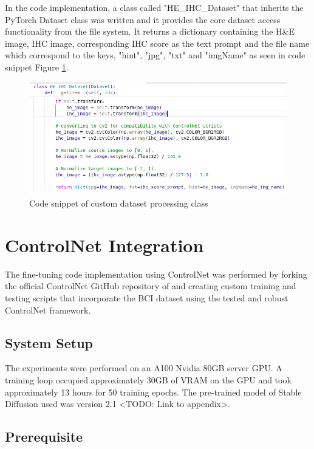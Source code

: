 In the code implementation, a class called "HE\_IHC\_Dataset" that inherits the PyTorch Dataset class was written and it provides the core dataset access functionality from the file system. It returns a dictionary containing the H\&E image, IHC image, corresponding IHC score as the text prompt and the file name which correspond to the keys, "hint", "jpg", "txt" and "imgName" as seen in code snippet Figure \ref{fig:he-ihc-dataset-class}.  
\begin{figure}[ht]
    \centering
    \includegraphics[width=1\linewidth]{4_ResearchMethodology/figures/he_ihc_dataset_class_return_snippet.png}
    \caption[Custom dataset processing class]{Code snippet of custom dataset processing class}
    \label{fig:he-ihc-dataset-class}
\end{figure}

\section{ControlNet Integration}

The fine-tuning code implementation using ControlNet was performed by forking the official ControlNet GitHub repository of \parencite{Zhang2023AddingModels} and creating custom training and testing scripts that incorporate the BCI dataset using the tested and robust ControlNet framework.

\subsection{System Setup}

The experiments were performed on an A100 Nvidia 80GB server GPU. A training loop occupied approximately 30GB of VRAM on the GPU and took approximately 13 hours for 50 training epochs. The pre-trained model of Stable Diffusion used was version 2.1 <TODO: Link to appendix>.

\subsection{Prerequisite}

